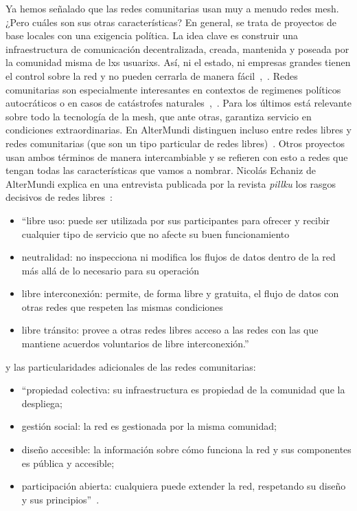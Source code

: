 Ya hemos señalado que las redes comunitarias usan muy a menudo redes mesh.
¿Pero cuáles son sus otras características?
En general, se trata de proyectos de base locales con una exigencia política.
La idea clave es construir una infraestructura de comunicación decentralizada, creada, mantenida y poseada por la comunidad misma de lxs usuarixs.
Así, ni el estado, ni empresas grandes tienen el control sobre la red y no pueden cerrarla de manera fácil~\autocite{Medosch2004},~\autocite{FiTre2015}.
Redes comunitarias son especialmente interesantes en contextos de regimenes políticos autocráticos o en casos de catástrofes naturales~\autocite[12]{Mabb2014},~\autocite{FiTre2015}.
Para los últimos está relevante sobre todo la tecnología de la mesh, que ante otras, garantiza servicio en condiciones extraordinarias.
En AlterMundi distinguen incluso entre redes libres y redes comunitarias (que son un tipo particular de redes libres)~\autocite{Piccoli2015}.
Otros proyectos usan ambos términos de manera intercambiable y se refieren con esto a redes que tengan todas las características que vamos a nombrar.
Nicolás Echaniz de AlterMundi explica en una entrevista publicada por la revista \textit{pillku} los rasgos decisivos de redes libres~\autocite{Piccoli2015}:
\begin{itemize}
  \item ``libre uso: puede ser utilizada por sus participantes para ofrecer y recibir cualquier tipo de servicio que no afecte su buen funcionamiento
  \item neutralidad: no inspecciona ni modifica los flujos de datos dentro de la red más allá de lo necesario para su operación
  \item libre interconexión: permite, de forma libre y gratuita, el flujo de datos con otras redes que respeten las mismas condiciones
  \item libre tránsito: provee a otras redes libres acceso a las redes con las que mantiene acuerdos voluntarios de libre interconexión.''
\end{itemize}

y las particularidades adicionales de las redes comunitarias:
\begin{itemize}
   \item ``propiedad colectiva: su infraestructura es propiedad de la comunidad que la despliega;
   \item gestión social: la red es gestionada por la misma comunidad;
   \item diseño accesible: la información sobre cómo funciona la red y sus componentes es pública y accesible;
   \item participación abierta: cualquiera puede extender la red, respetando su diseño y sus principios''~\autocite{Piccoli2015}.
\end{itemize}

